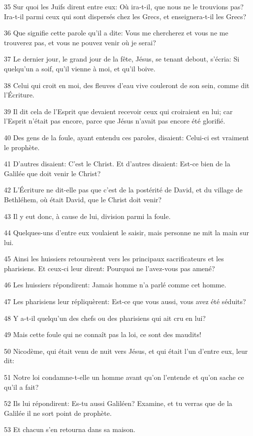 \par 35 Sur quoi les Juifs dirent entre eux: Où ira-t-il, que nous ne le trouvions pas? Ira-t-il parmi ceux qui sont dispersés chez les Grecs, et enseignera-t-il les Grecs?
\par 36 Que signifie cette parole qu'il a dite: Vous me chercherez et vous ne me trouverez pas, et vous ne pouvez venir où je serai?
\par 37 Le dernier jour, le grand jour de la fête, Jésus, se tenant debout, s'écria: Si quelqu'un a soif, qu'il vienne à moi, et qu'il boive.
\par 38 Celui qui croit en moi, des fleuves d'eau vive couleront de son sein, comme dit l'Écriture.
\par 39 Il dit cela de l'Esprit que devaient recevoir ceux qui croiraient en lui; car l'Esprit n'était pas encore, parce que Jésus n'avait pas encore été glorifié.
\par 40 Des gens de la foule, ayant entendu ces paroles, disaient: Celui-ci est vraiment le prophète.
\par 41 D'autres disaient: C'est le Christ. Et d'autres disaient: Est-ce bien de la Galilée que doit venir le Christ?
\par 42 L'Écriture ne dit-elle pas que c'est de la postérité de David, et du village de Bethléhem, où était David, que le Christ doit venir?
\par 43 Il y eut donc, à cause de lui, division parmi la foule.
\par 44 Quelques-uns d'entre eux voulaient le saisir, mais personne ne mit la main sur lui.
\par 45 Ainsi les huissiers retournèrent vers les principaux sacrificateurs et les pharisiens. Et ceux-ci leur dirent: Pourquoi ne l'avez-vous pas amené?
\par 46 Les huissiers répondirent: Jamais homme n'a parlé comme cet homme.
\par 47 Les pharisiens leur répliquèrent: Est-ce que vous aussi, vous avez été séduits?
\par 48 Y a-t-il quelqu'un des chefs ou des pharisiens qui ait cru en lui?
\par 49 Mais cette foule qui ne connaît pas la loi, ce sont des maudits!
\par 50 Nicodème, qui était venu de nuit vers Jésus, et qui était l'un d'entre eux, leur dit:
\par 51 Notre loi condamne-t-elle un homme avant qu'on l'entende et qu'on sache ce qu'il a fait?
\par 52 Ils lui répondirent: Es-tu aussi Galiléen? Examine, et tu verras que de la Galilée il ne sort point de prophète.
\par 53 Et chacun s'en retourna dans sa maison.

